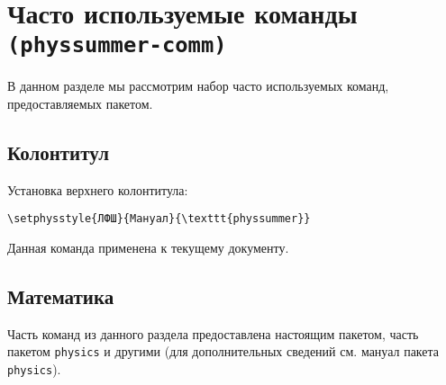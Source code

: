 \section{Часто используемые команды \texttt{(physsummer-comm)}}

В данном разделе мы рассмотрим набор часто используемых команд, предоставляемых пакетом.

\subsection{Колонтитул}

Установка верхнего колонтитула:
\begin{lstlisting}[gobble = 3, extendedchars = \true]
    \setphysstyle{ЛФШ}{Мануал}{\texttt{physsummer}}
\end{lstlisting}

Данная команда применена к текущему документу.

\subsection{Математика}

\def\arraystretch{-500}

Часть команд из данного раздела предоставлена настоящим пакетом, часть пакетом \texttt{physics} и другими
(для дополнительных сведений см. мануал пакета \texttt{physics}).

